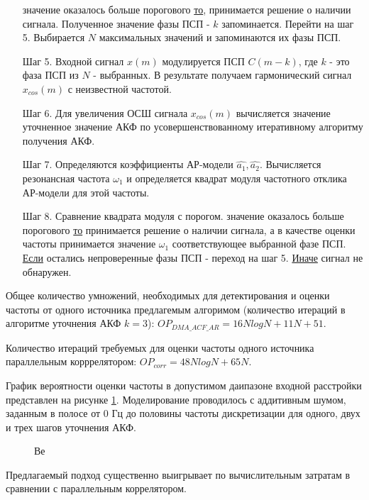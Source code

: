 \begin{itemize}
	  значение оказалось больше порогового {\underline{то}},
		принимается решение о наличии сигнала. Полученное значение фазы ПСП  - ${k}$ запоминается.
		Перейти на шаг 5.
		Выбирается ${N}$ максимальных значений и запоминаются их фазы ПСП.
\item[Шаг 5.] Входной сигнал ${x(m)}$ модулируется ПСП ${C(m-k)}$, где ${k}$ - это фаза ПСП из ${N}$ - выбранных. В результате получаем гармонический
	сигнал ${x_{cos}(m)}$ с неизвестной частотой.
\item[Шаг 6.] Для увеличения ОСШ сигнала ${x_{cos}(m)}$ вычисляется значение уточненное значение АКФ
	по усовершенствованному итеративному алгоритму получения АКФ.
\item[Шаг 7.] Определяются коэффициенты АР-модели ${\hat{a_1}, \hat{a_2}}$.
	Вычисляется резонансная частота ${\omega_1}$ и определяется квадрат модуля частотного отклика АР-модели для этой частоты. 
\item[Шаг 8.]
	Сравнение квадрата модуля с порогом.
          значение оказалось больше порогового {\underline{то}} 
                принимается решение о наличии сигнала, а в качестве оценки
                частоты принимается значение ${\omega_1}$ соответствующее выбранной фазе ПСП. 
		\subsubitem\underline{Если} остались непроверенные фазы ПСП - переход на шаг 5.
		\subsubitem\underline{Иначе} сигнал не обнаружен.
\end{itemize}

Общее количество умножений, необходимых для детектирования и оценки частоты от одного источника предлагемым
алгоримом (количество итераций в алгоритме уточнения АКФ ${k=3}$): ${OP_{DMA\_ACF\_AR} = 16NlogN + 11N + 51}$.

Количество итераций требуемых для оценки частоты одного источника параллельным корррелятором:
${OP_{corr} = 48NlogN + 65N}$.

График вероятности оценки частоты в допустимом даипазоне входной расстройки представлен на рисунке
\ref{pic:ar_dma_probability}. Моделирование проводилось с аддитивным шумом, заданным в полосе от 0 Гц до
половины частоты дискретизации для одного, двух и трех шагов уточнения АКФ.

\begin{figure}[H]
\center{}
	\caption{Ве}
	\label{pic:ar_dma_probability}
\end{figure}

Предлагаемый подход существенно выигрывает по вычислительным затратам в сравнении с параллельным коррелятором.


